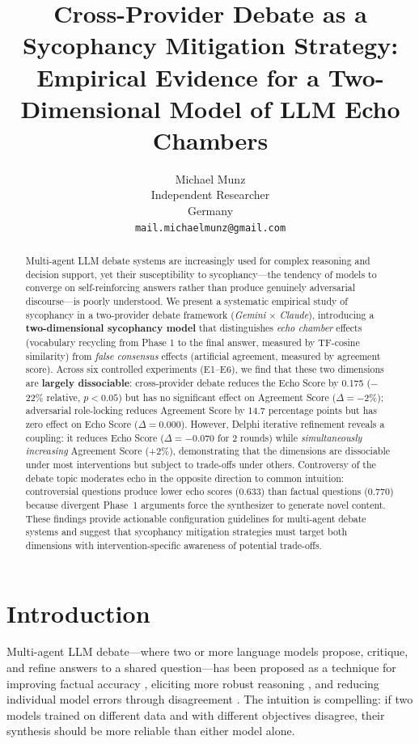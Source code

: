 \documentclass[11pt]{article}
\title{Cross-Provider Debate as a Sycophancy Mitigation Strategy:\\
Empirical Evidence for a Two-Dimensional Model of LLM Echo Chambers}
\author{
  Michael Munz\\
  Independent Researcher\\
  Germany\\
  \texttt{mail.michaelmunz@gmail.com}
}
\date{}
\begin{document}
\maketitle

\begin{abstract}
Multi-agent LLM debate systems are increasingly used for complex reasoning and decision support, yet their susceptibility to sycophancy---the tendency of models to converge on self-reinforcing answers rather than produce genuinely adversarial discourse---is poorly understood. We present a systematic empirical study of sycophancy in a two-provider debate framework (\textit{Gemini} $\times$ \textit{Claude}), introducing a \textbf{two-dimensional sycophancy model} that distinguishes \textit{echo chamber} effects (vocabulary recycling from Phase 1 to the final answer, measured by TF-cosine similarity) from \textit{false consensus} effects (artificial agreement, measured by agreement score). Across six controlled experiments (E1--E6), we find that these two dimensions are \textbf{largely dissociable}: cross-provider debate reduces the Echo Score by 0.175 ($-$22\% relative, $p {<} 0.05$) but has no significant effect on Agreement Score ($\Delta = -2\%$); adversarial role-locking reduces Agreement Score by 14.7 percentage points but has zero effect on Echo Score ($\Delta = 0.000$). However, Delphi iterative refinement reveals a coupling: it reduces Echo Score ($\Delta = -0.070$ for 2 rounds) while \textit{simultaneously increasing} Agreement Score (+2\%), demonstrating that the dimensions are dissociable under most interventions but subject to trade-offs under others. Controversy of the debate topic moderates echo in the opposite direction to common intuition: controversial questions produce lower echo scores ($0.633$) than factual questions ($0.770$) because divergent Phase~1 arguments force the synthesizer to generate novel content. These findings provide actionable configuration guidelines for multi-agent debate systems and suggest that sycophancy mitigation strategies must target both dimensions with intervention-specific awareness of potential trade-offs.
\end{abstract}

\section{Introduction}
\label{sec:intro}

Multi-agent LLM debate---where two or more language models propose, critique, and refine answers to a shared question---has been proposed as a technique for improving factual accuracy \citep{du2023improving}, eliciting more robust reasoning \citep{liang2023encouraging}, and reducing individual model errors through disagreement \citep{chan2023chateval}. The intuition is compelling: if two models trained on different data and with different objectives disagree, their synthesis should be more reliable than either model alone.
\end{document}
